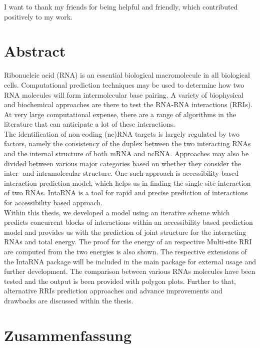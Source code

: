 \documentclass[twoside,a4paper]{report}
\numberwithin{equation}{section}
\begin{document}
I want to thank my friends for being helpful and friendly, which contributed positively to my work.
 \\


\newpage
\chapter*{Abstract}

Ribonucleic acid (RNA) is an essential biological macromolecule in all biological cells. Computational prediction techniques may be used to determine how two RNA molecules will form intermolecular base pairing. A variety of biophysical and biochemical approaches are there to test the RNA-RNA interactions (RRIs). At very large computational expense, there are a range of algorithms in the literature that can anticipate a lot of these interactions.\\

 The identification of non-coding (nc)RNA targets is largely regulated by two factors, namely the consistency of the duplex between the two interacting RNAs and the internal structure of both mRNA and ncRNA. Approaches may also be divided between various major categories based on whether they consider the inter- and intramolecular structure. One such approach is accessibility based interaction prediction model, which helps us in finding the single-site interaction of two RNAs. IntaRNA is a tool for rapid and precise prediction of interactions for accessibility based approach.  \\

 Within this thesis, we developed a model using an iterative scheme which predicts concurrent blocks of interactions within an accessibility based prediction model and provides us with the prediction of  joint structure for the interacting RNAs and total energy. The proof for the energy of an respective Multi-site RRI are computed from the two energies is also shown. The respective extensions of the IntaRNA package will be included in the main package for external usage and further development. The comparison between various RNAs molecules have been tested and the output is been provided with polygon plots. Further to that, alternative RRIs prediction approaches and advance improvements and drawbacks are discussed within the thesis. \\



\newpage
\chapter*{Zusammenfassung}
\end{document}
